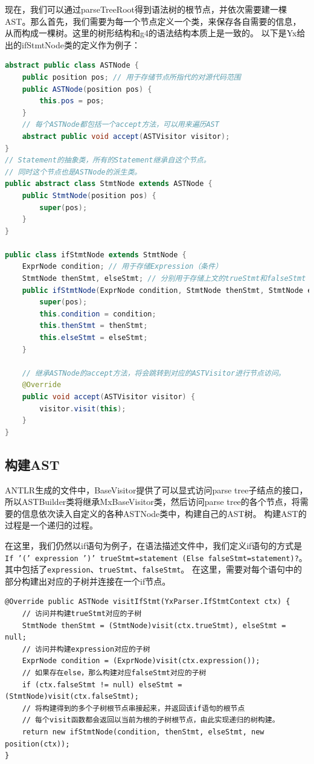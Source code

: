 现在，我们可以通过parseTreeRoot得到语法树的根节点，并依次需要建一棵AST。那么首先，我们需要为每一个节点定义一个类，来保存各自需要的信息，
从而构成一棵树。这里的树形结构和g4的语法结构本质上是一致的。
以下是Yx给出的ifStmtNode类的定义作为例子：
\begin{lstlisting}[language=Java]
abstract public class ASTNode {
    public position pos; // 用于存储节点所指代的对源代码范围
    public ASTNode(position pos) {
        this.pos = pos;
    }
    // 每个ASTNode都包括一个accept方法，可以用来遍历AST
    abstract public void accept(ASTVisitor visitor);
}
// Statement的抽象类，所有的Statement继承自这个节点。
// 同时这个节点也是ASTNode的派生类。
public abstract class StmtNode extends ASTNode {
    public StmtNode(position pos) {
        super(pos);
    }
}

public class ifStmtNode extends StmtNode {
    ExprNode condition; // 用于存储Expression（条件）
    StmtNode thenStmt, elseStmt; // 分别用于存储上文的trueStmt和falseStmt
    public ifStmtNode(ExprNode condition, StmtNode thenStmt, StmtNode elseStmt, position pos) {
        super(pos);
        this.condition = condition;
        this.thenStmt = thenStmt;
        this.elseStmt = elseStmt;
    }
    
    // 继承ASTNode的accept方法，将会跳转到对应的ASTVisitor进行节点访问。
    @Override
    public void accept(ASTVisitor visitor) {
        visitor.visit(this);
    }
}
\end{lstlisting}



\subsection{构建AST}
ANTLR生成的文件中，BaseVisitor提供了可以显式访问parse tree子结点的接口，所以ASTBuilder类将继承MxBaseVisitor类，然后访问parse tree的各个节点，将需要的信息依次读入自定义的各种ASTNode类中，构建自己的AST树。
构建AST的过程是一个递归的过程。

在这里，我们仍然以if语句为例子，在语法描述文件中，我们定义if语句的方式是\texttt{If '(' expression ')' trueStmt=statement (Else falseStmt=statement)?}。
其中包括了\texttt{expression}、\texttt{trueStmt}、\texttt{falseStmt}。
在这里，需要对每个语句中的部分构建出对应的子树并连接在一个if节点。
\begin{lstlisting}
@Override public ASTNode visitIfStmt(YxParser.IfStmtContext ctx) {
    // 访问并构建trueStmt对应的子树
    StmtNode thenStmt = (StmtNode)visit(ctx.trueStmt), elseStmt = null;
    // 访问并构建expression对应的子树
    ExprNode condition = (ExprNode)visit(ctx.expression());
    // 如果存在else，那么构建对应falseStmt对应的子树
    if (ctx.falseStmt != null) elseStmt = (StmtNode)visit(ctx.falseStmt);
    // 将构建得到的多个子树根节点串接起来，并返回该if语句的根节点
    // 每个visit函数都会返回以当前为根的子树根节点，由此实现递归的树构建。
    return new ifStmtNode(condition, thenStmt, elseStmt, new position(ctx));
}
\end{lstlisting}


